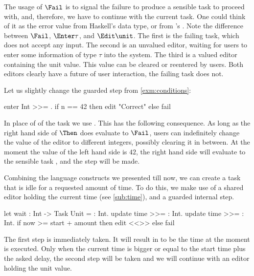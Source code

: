 The usage of $\Fail$ is to signal the failure to produce a sensible task to proceed with,
and, therefore, we have to continue with the current task.
One could think of it as the error value  from Haskell's  data type,
or  from \ML's .
Note the difference between $\Fail$, $\Enter \tau$, and $\Edit \unit$.
The first is the failing task, which does not accept any input.
The second is an unvalued editor,
waiting for users to enter some information of type $\tau$ into the system.
The third is a valued editor containing the unit value.
This value can be cleared or reentered by users.
Both editors clearly have a future of user interaction,
the failing task does not.



\begin{example}

Let us slightly change the guarded step from \autoref{exm:conditions}:
\begin{TASK}
  enter Int >>= \n. if n == 42 then edit "Correct" else fail
\end{TASK}
In place of of the task  we use .
This has the following consequence.
As long as the right hand side of $\Then$ does evaluate to $\Fail$,
users can indefinitely change the value of the editor to different integers,
possibly clearing it in between.
At the moment the value of the left hand side is $42$,
the right hand side will evaluate to the sensible task ,
and the step will be made.

\end{example}



\begin{example}[Wait]\label{exm:wait}

Combining the language constructs we presented till now,
we can create a task that is idle for a requested amount of time.
To do this,
we make use of a shared editor holding the current time (see \autoref{sub:time}),
and a guarded internal step.
\begin{TASK}
  let wait : Int -> Task Unit = \amount : Int.
    update time >>= \start : Int.
    update time >>= \now : Int.
      if now >= start + amount then edit <<>> else fail
\end{TASK}
The first step is immediately taken.
It will result in  to be the time at the moment  is executed.
Only when the current time  is bigger or equal to the start time plus the asked delay,
the second step will be taken and we will continue with an editor holding the unit value.

\end{example}



